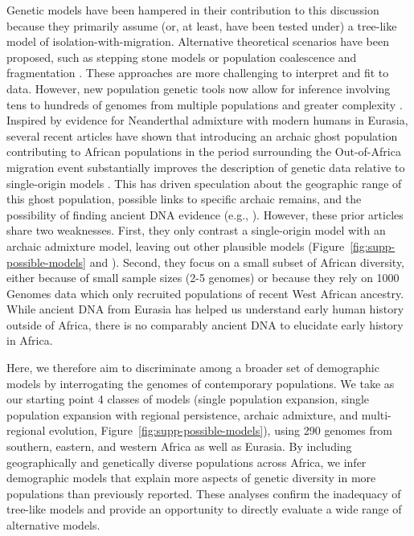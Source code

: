\documentclass{article}
\begin{document}
Genetic models have been hampered in their contribution to this discussion
because they primarily assume (or, at least, have been tested under) a
tree-like model of isolation-with-migration. Alternative theoretical scenarios
have been proposed, such as stepping stone models \citep{Arredondo2021-qa} or
population coalescence and fragmentation \citep{Scerri2019-xg}. These
approaches are more challenging to interpret and fit to data. However, new
population genetic tools now allow for inference involving tens to
hundreds of genomes from multiple populations and greater complexity
\citep{Kamm2020-vn,Ragsdale2019-nt,Speidel2019-nj}. Inspired by evidence for
Neanderthal admixture with modern humans in Eurasia, several recent articles
have shown that introducing an archaic ghost population contributing to African
populations in the period surrounding the Out-of-Africa migration event
substantially improves the description of genetic data relative to
single-origin models
\citep{Plagnol2006-lt,Hammer2011-bx,Hsieh2016-gk,Hey2018-pw,Ragsdale2019-nt,Durvasula2020-td,Lorente-Galdos2019-vz,Durvasula2020-td}.
This has driven speculation about the geographic range of this ghost
population, possible links to specific archaic remains, and the possibility of
finding ancient DNA evidence (e.g., \citet{Hsieh2016-gk}). However, these prior
articles share two weaknesses. First, they only contrast a single-origin model
with an archaic admixture model, leaving out other plausible models
(Figure~\ref{fig:supp-possible-models} and \citet{Henn2018-rf}). Second, they
focus on a small subset of African diversity, either because of small sample
sizes (2-5 genomes) or because they rely on 1000 Genomes data which only
recruited populations of recent West African ancestry. While ancient DNA from
Eurasia has helped us understand early human history outside of Africa, there
is no comparably ancient DNA to elucidate early history in Africa.

Here, we therefore aim to discriminate among a broader set of demographic
models by interrogating the genomes of contemporary populations. We take as our
starting point 4 classes of models (single population expansion, single
    population expansion with regional persistence, archaic admixture, and
multi-regional evolution, Figure~\ref{fig:supp-possible-models}), using 290
genomes from southern, eastern, and western Africa as well as Eurasia. By
including geographically and genetically diverse populations across Africa, we
infer demographic models that explain more aspects of genetic diversity in more
populations than previously reported. These analyses confirm the inadequacy of
tree-like models and provide an opportunity to directly evaluate a wide range
of alternative models.
\end{document}
